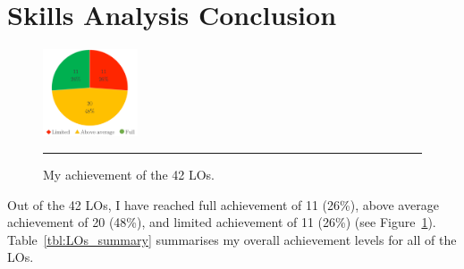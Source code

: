 
\section{Skills Analysis Conclusion}


\begin{figure}
	\centering
	\includegraphics[width=0.25\textwidth]{figures/LO_pie_3.png}
	\rule{0.25\textwidth}{0.5pt} %
	\caption{My achievement of the 42 LOs.}
	\label{fig:LO_pie}
\end{figure}

Out of the 42 LOs, I have reached full achievement of 11 (26\%), above average achievement of 20 (48\%), and limited achievement of 11 (26\%) (see Figure~\ref{fig:LO_pie}).
Table~\ref{tbl:LOs_summary} summarises my overall achievement levels for all of the LOs.


